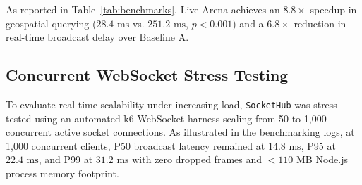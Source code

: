 \documentclass[conference]{IEEEtran}
\begin{document}
\begin{table}[htbp]
\caption{Empirical Performance Benchmarks Across Core Operations ($K = 50$ Iterations, Mean $\pm$ Standard Deviation)}
\label{tab:benchmarks}
\centering
{}
\end{table}

As reported in Table~\ref{tab:benchmarks}, Live Arena achieves an $8.8\times$ speedup in geospatial querying ($28.4\text{ ms}$ vs. $251.2\text{ ms}$, $p < 0.001$) and a $6.8\times$ reduction in real-time broadcast delay over Baseline A.

\subsection{Concurrent WebSocket Stress Testing}
To evaluate real-time scalability under increasing load, \texttt{SocketHub} was stress-tested using an automated k6 WebSocket harness scaling from 50 to 1,000 concurrent active socket connections. As illustrated in the benchmarking logs, at 1,000 concurrent clients, P50 broadcast latency remained at $14.8\text{ ms}$, P95 at $22.4\text{ ms}$, and P99 at $31.2\text{ ms}$ with zero dropped frames and $<110\text{ MB}$ Node.js process memory footprint.
\end{document}
